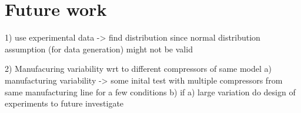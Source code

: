 \section{Future work}
\label{sec:future_work}
1) use experimental data -> find distribution since normal distribution assumption (for data generation) might not be valid

2) Manufacuring variability wrt to different compressors of same model
a) manufacturing variability -> some inital test with multiple compressors from same manufacturing line for a few conditions
b) if a) large variation do design of experiments to future investigate